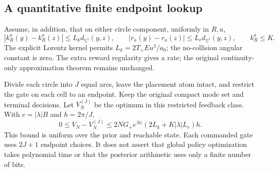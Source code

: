 \subsection{A quantitative finite endpoint lookup}
Assume, in addition, that on either circle component, uniformly in $R,a$,
\[
 |k_R^a(y)-k_R^a(z)|\le L_k d_{\mathbb S^1}(y,z),\qquad
 |r_a(y)-r_a(z)|\le L_r d_{\mathbb S^1}(y,z),\qquad k_R^a\le K.
\]
The explicit Lorentz kernel permits $L_k=2T_+Eu^3/a_0$; the no-collision
angular constant is zero. The extra reward regularity gives a rate; the
original continuity-only approximation theorem remains unchanged.

\begin{theorem}\label{thm:lookup-rate}
Divide each circle into $J$ equal arcs, leave the placement atom intact,
and restrict the gate on each cell to an endpoint. Keep the original compact
mode set and terminal decisions. Let $V_N^{(J)}$ be the optimum in this
restricted feedback class. With $c=|\lambda|B$ and $h=2\pi/J$,
\begin{equation}
 0\le V_N-V_N^{(J)}
 \le 2N G_+e^{Nc}(2L_k+K|\lambda|L_r)h. \label{eq:lookup-rate}
\end{equation}
This bound is uniform over the prior and reachable state. Each commanded
gate uses $2J+1$ endpoint choices. It does not assert that global policy
optimization takes polynomial time or that the posterior arithmetic uses
only a finite number of bits.
\end{theorem}
